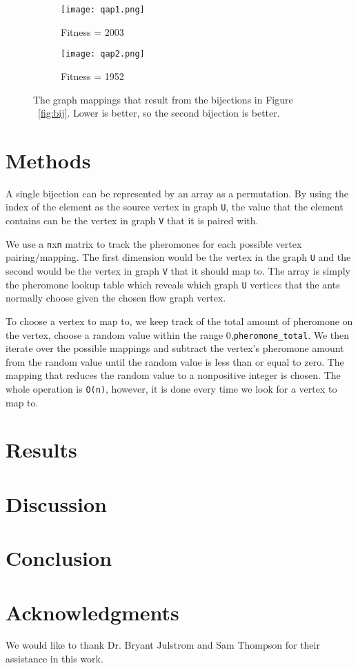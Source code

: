 \documentclass[sigconf]{acmart}
\begin{document}
\begin {figure}
\centering
\begin{subfigure}{.5\columnwidth}
	\centering
	\texttt{[image: qap1.png]}
	\caption{Fitness = 2003}
	\label{fig:sub1}
\end{subfigure}%
\begin{subfigure}{.5\columnwidth}
	\centering
	\texttt{[image: qap2.png]}
	\caption{Fitness = 1952}
	\label{fig:sub2}
\end{subfigure}
\caption {The graph mappings that result from the bijections in Figure ~\ref{fig:bij}. Lower is better, so the second bijection is better.}
\label{fig:qap}
\end {figure}

\section {Methods}
A single bijection can be represented by an array as a permutation. By using the index of the element as the source vertex in graph \verb|U|, the value that the element contains can be the vertex in graph \verb|V| that it is paired with.

We use a \verb|n|x\verb|n| matrix to track the pheromones for each possible vertex pairing/mapping. The first dimension would be the vertex in the graph \verb|U| and the second would be the vertex in graph \verb|V| that it should map to. The array is simply the pheromone lookup table which reveals which graph \verb|U| vertices that the ants normally choose given the chosen flow graph vertex.

To choose a vertex to map to, we keep track of the total amount of pheromone on the vertex, choose a random value within the range {0,\verb|pheromone_total|}. We then iterate over the possible mappings and subtract the vertex's pheromone amount from the random value until the random value is less than or equal to zero. The mapping that reduces the random value to a nonpositive integer is chosen. The whole operation is \verb|O(n)|, however, it is done every time we look for a vertex to map to.

\section {Results}

\section {Discussion}

\section {Conclusion}

\section {Acknowledgments}
We would like to thank Dr. Bryant Julstrom and Sam Thompson for their assistance in this work.


{}
\end{document}
